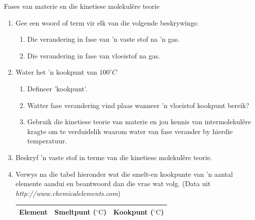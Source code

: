             \begin{eocexercises}{Fases van materie en die kinetiese molekul\^{e}re teorie}
            \nopagebreak \noindent
\label{m38730*id311490}\begin{enumerate}[noitemsep, label=\textbf{\arabic*}. ] 
            \label{m38730*uid87}\item Gee een woord of term vir elk van die volgende beskrywings:
\label{m38730*id311506}\begin{enumerate}[noitemsep, label=\textbf{\alph*}. ] 
            \label{m38730*uid88}\item Die verandering in fase van  'n vaste stof na  'n gas.
\label{m38730*uid89}\item Die verandering in fase van vloeistof na gas.
\end{enumerate}
                \label{m38730*uid103}\item Water het  'n kookpunt van $100 ^{\circ} C$
\label{m38730*id311744}\begin{enumerate}[noitemsep, label=\textbf{\alph*}. ] 
            \label{m38730*uid104}\item Defineer 'kookpunt'.
\label{m38730*uid105}\item Watter fase verandering vind plaas wanneer  'n vloeistof kookpunt bereik?
\label{m38730*uid107}\item Gebruik die kinetiese teorie van materie en jou kennis van intermolekul\^{e}re kragte om te verduidelik waarom water van fase verander by hierdie temperatuur.
\end{enumerate}
\label{m38730*id762}\item Beskryf  'n vaste stof in terme van die kinetiese molekul\^{e}re teorie. \newline
            \label{m38730*uid108}\item Verwys na die tabel hieronder wat die smelt-en kookpunte van  'n aantal elemente aandui en beantwoord dan die vrae wat volg. (Data uit \textsl{http://www.chemicalelements.com})
          \begin{table}[H]
        \begin{center}
      \label{m38730*id311817}
      \begin{tabular}{|l|l|l|}\hline
\textbf{Element} & \textbf{Smeltpunt ($^{\circ} \text{C}$)} & \textbf{Kookpunt ($^{\circ} \text{C}$)} \\ \hline

\end{tabular}
\end{center}
\end{table}
\end{enumerate}
\end{eocexercises}
